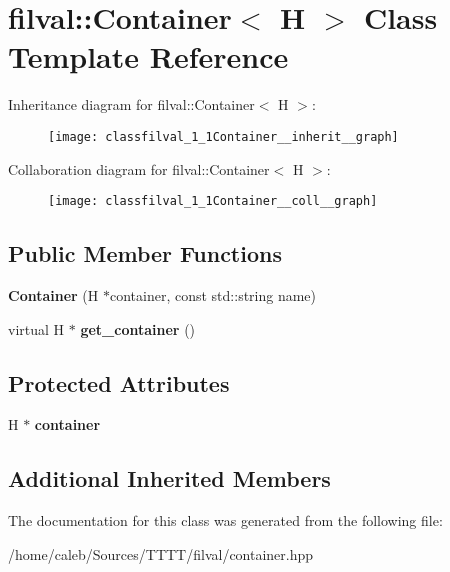\hypertarget{classfilval_1_1Container}{}\section{filval\+:\+:Container$<$ H $>$ Class Template Reference}
\label{classfilval_1_1Container}


Inheritance diagram for filval\+:\+:Container$<$ H $>$\+:
\nopagebreak
\begin{figure}[H]
\begin{center}
\leavevmode
\texttt{[image: classfilval\_1\_1Container\_\_inherit\_\_graph]}
\end{center}
\end{figure}


Collaboration diagram for filval\+:\+:Container$<$ H $>$\+:
\nopagebreak
\begin{figure}[H]
\begin{center}
\leavevmode
\texttt{[image: classfilval\_1\_1Container\_\_coll\_\_graph]}
\end{center}
\end{figure}
\subsection*{Public Member Functions}
\begin{DoxyCompactItemize}
\item 
\hypertarget{classfilval_1_1Container_a47b66830c299fec3b551139515016980}{}\label{classfilval_1_1Container_a47b66830c299fec3b551139515016980} 
{\bfseries Container} (H $\ast$container, const std\+::string name)
\item 
\hypertarget{classfilval_1_1Container_ae0e8253e6d5db21c6346bc098676946d}{}\label{classfilval_1_1Container_ae0e8253e6d5db21c6346bc098676946d} 
virtual H $\ast$ {\bfseries get\+\_\+container} ()
\end{DoxyCompactItemize}
\subsection*{Protected Attributes}
\begin{DoxyCompactItemize}
\item 
\hypertarget{classfilval_1_1Container_aadd43c19fd81926e5a30e6cc135c67df}{}\label{classfilval_1_1Container_aadd43c19fd81926e5a30e6cc135c67df} 
H $\ast$ {\bfseries container}
\end{DoxyCompactItemize}
\subsection*{Additional Inherited Members}


The documentation for this class was generated from the following file\+:\begin{DoxyCompactItemize}
\item 
/home/caleb/\+Sources/\+T\+T\+T\+T/filval/container.\+hpp\end{DoxyCompactItemize}

